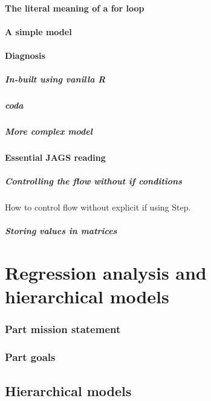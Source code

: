 \documentclass[11pt,fullpage]{book}
\begin{document}
\subsection{The literal meaning of a for loop}
\subsection{A simple model}
\subsection{Diagnosis}
\subsubsection{In-built using vanilla R}
\subsubsection{coda}
\subsubsection{More complex model}

\subsection{Essential JAGS reading}
\subsubsection{Controlling the flow without if conditions}
How to control flow without explicit if using Step.
\subsubsection{Storing values in matrices}


\part{Regression analysis and hierarchical models}\label{part:regressionHierarchical}
\section{Part mission statement}
\section{Part goals}

\chapter{Hierarchical models}\label{chap:hierarchicalModels}
\end{document}

